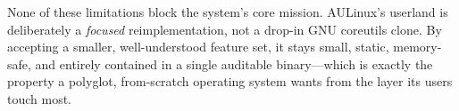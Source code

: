 \begin{infobox}
None of these limitations block the system's core mission. AULinux's userland is
deliberately a \emph{focused} reimplementation, not a drop-in GNU coreutils
clone. By accepting a smaller, well-understood feature set, it stays small,
static, memory-safe, and entirely contained in a single auditable binary---which
is exactly the property a polyglot, from-scratch operating system wants from the
layer its users touch most.
\end{infobox}

